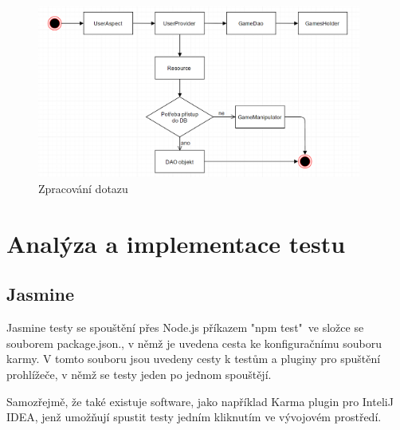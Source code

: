 \documentclass[czech,master,public,dept460,male,cpdeclaration,twoside]{diploma}
\begin{document}
\begin{figure}[H]
\centering\includegraphics[width=0.95\textwidth]{Figures/RequestFlow.png}\caption{Zpracování dotazu}
\end{figure}

\section{Analýza a implementace testu}

\subsection{Jasmine}
Jasmine testy se spouštění přes Node.js příkazem "npm test"~ve složce se souborem package.json., v němž je uvedena cesta ke konfiguračnímu souboru karmy. V tomto souboru jsou uvedeny cesty k testům a pluginy pro spuštění prohlížeče, v němž se testy jeden po jednom spouštějí. 

Samozřejmě, že také existuje software, jako například Karma plugin pro InteliJ IDEA, jenž umožňují spustit testy jedním kliknutím ve vývojovém prostředí.
\end{document}
